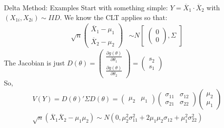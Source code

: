 \documentclass[11pt,handout,xcolor=pdftex,dvipsnames,table,mathserif,aspectratio=169]{beamer}
\begin{document}
\begin{frame}{Delta Method: Examples}
Start with something simple: $Y= \overline{X}_1\cdot \overline{X}_2$ with $(X_{1i},X_{2i}) \sim IID$.
We know the CLT applies so that:
\begin{eqnarray*}
\sqrt{n}
\begin{pmatrix}
\overline{X}_1 - \mu_1\\
\overline{X}_2 - \mu_2
\end{pmatrix} &\sim  N
\begin{bmatrix}
\begin{pmatrix}
0\\
0
\end{pmatrix},
\Sigma
\end{bmatrix}
\end{eqnarray*}
The Jacobian is just $D(\theta) =  \begin{pmatrix}\frac{\partial g(\theta)}{\partial \theta_1} \\ \frac{\partial g(\theta)}{\partial \theta_2}  \end{pmatrix} =  \begin{pmatrix}s_2\\ s_1 \end{pmatrix}$\\
So,
\begin{eqnarray*}
V(Y) = D(\theta)' \Sigma D(\theta) =\begin{pmatrix} \mu_2 & \mu_1 \end{pmatrix}  \begin{pmatrix} \sigma_{11} & \sigma_{12} \\ \sigma_{21} & \sigma_{22} \end{pmatrix} \begin{pmatrix} \mu_2 \\\mu_1  
\end{pmatrix} \\
\sqrt{n} ( \overline{X}_1 \overline{X}_2 - \mu_1 \mu_2) \sim N(0,\mu_2^2 \sigma_{11}^2 + 2 \mu_1 \mu_2 \sigma_{12}  + \mu_1^2 \sigma_{22}^2)
\end{eqnarray*}
\end{frame}
\end{document}

